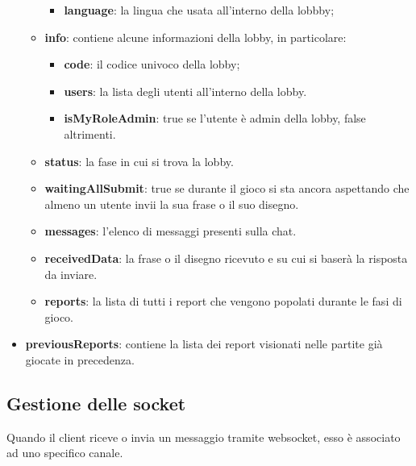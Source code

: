 \begin{itemize}
\begin{itemize}
\begin{itemize}
                \item \textbf{language}: la lingua che usata all'interno della lobbby;
            \end{itemize}
        \item \textbf{info}: contiene alcune informazioni della lobby, in particolare:
            \begin{itemize}
                \item \textbf{code}: il codice univoco della lobby;
                \item \textbf{users}: la lista degli utenti all'interno della lobby.
                \item \textbf{isMyRoleAdmin}: true se l'utente è admin della lobby, false altrimenti.
            \end{itemize}
        \item \textbf{status}: la fase in cui si trova la lobby.
        \item \textbf{waitingAllSubmit}: true se durante il gioco si sta ancora aspettando che almeno un utente invii la sua frase o il suo disegno.
        \item \textbf{messages}: l'elenco di messaggi presenti sulla chat.
        \item \textbf{receivedData}: la frase o il disegno ricevuto e su cui si baserà la risposta da inviare.
        \item \textbf{reports}: la lista di tutti i report che vengono popolati durante le fasi di gioco.
    \end{itemize}

    \item \textbf{previousReports}: contiene la lista dei report visionati nelle partite già giocate in precedenza.
\end{itemize}

\subsection{Gestione delle socket}
Quando il client riceve o invia un messaggio tramite websocket, esso è associato ad uno specifico canale.

